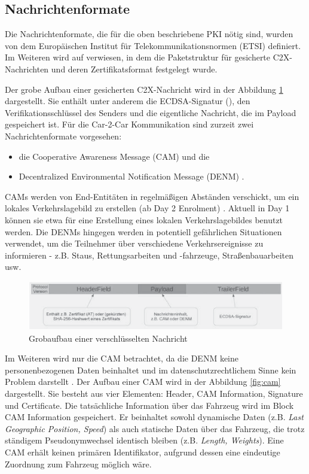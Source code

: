 \subsection{Nachrichtenformate}
\label{sec:FirstContentSection:SecondSubSection}

Die Nachrichtenformate, die für die oben beschriebene PKI nötig sind, wurden von dem Europäischen Institut für Telekommunikationsnormen (ETSI) definiert. Im Weiteren wird auf \cite{ETSI2018} verwiesen, in dem die Paketstruktur für gesicherte C2X-Nachrichten und deren Zertifikatsformat festgelegt wurde. 

Der grobe Aufbau einer gesicherten C2X-Nachricht wird in der Abbildung \ref{fig:nachrichtenaufbau} dargestellt. Sie enthält unter anderem die ECDSA-Signatur (\cite{Barker2013}), den Verifikationsschlüssel des Senders und die eigentliche Nachricht, die im Payload gespeichert ist. Für die Car-2-Car Kommunikation sind zurzeit zwei Nachrichtenformate vorgesehen:
\begin{itemize}
	\item die Cooperative Awareness Message (CAM) und die 
	\item Decentralized Environmental Notification Message (DENM) \cite{ETSI2013}.
\end{itemize}
CAMs werden von End-Entitäten in regelmäßigen Abständen verschickt, um ein lokales Verkehrslagebild zu erstellen (ab Day 2 Enrolment) . Aktuell in Day 1 können sie etwa für eine Erstellung eines lokalen Verkehrslagebildes benutzt werden. Die DENMs hingegen werden in potentiell gefährlichen Situationen verwendet, um die Teilnehmer über verschiedene Verkehrsereignisse zu informieren - z.B. Staus, Rettungsarbeiten und -fahrzeuge, Straßenbauarbeiten usw. 

\begin{figure}
	\centering
	\includegraphics[width=0.7\linewidth]{images/Nachrichtenaufbau}
	\caption[Grobaufbau einer verschlüsselten Nachricht]{Grobaufbau einer verschlüsselten Nachricht \footnotemark}
	\label{fig:nachrichtenaufbau}
\end{figure}

Im Weiteren wird nur die CAM betrachtet, da die DENM keine personenbezogenen Daten beinhaltet und im datenschutzrechtlichem Sinne kein Problem darstellt \cite{Kiometzis2017}. Der Aufbau einer CAM wird in der Abbildung \ref{fig:cam} dargestellt. Sie besteht aus vier Elementen: Header, CAM Information, Signature und Certificate. Die tatsächliche Information über das Fahrzeug wird im Block CAM Information gespeichert. Er beinhaltet sowohl dynamische Daten (z.B. \textit{Last Geographic Position, Speed}) als auch statische Daten über das Fahrzeug, die trotz ständigem Pseudonymwechsel identisch bleiben (z.B. \textit{Length, Weights}). Eine CAM erhält keinen primären Identifikator, aufgrund dessen eine eindeutige Zuordnung zum Fahrzeug möglich wäre.

